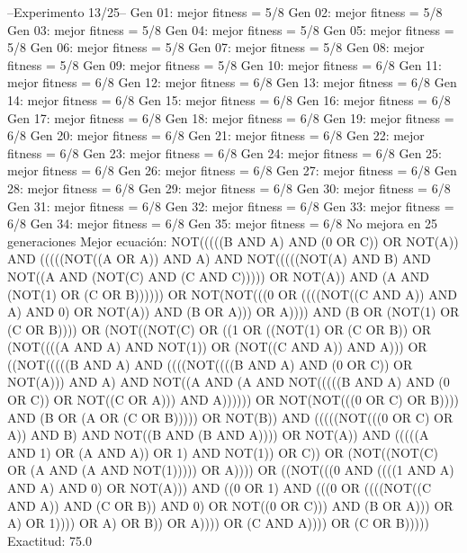 --Experimento 
 13/25--
Gen 01: mejor fitness = 5/8
Gen 02: mejor fitness = 5/8
Gen 03: mejor fitness = 5/8
Gen 04: mejor fitness = 5/8
Gen 05: mejor fitness = 5/8
Gen 06: mejor fitness = 5/8
Gen 07: mejor fitness = 5/8
Gen 08: mejor fitness = 5/8
Gen 09: mejor fitness = 5/8
Gen 10: mejor fitness = 6/8
Gen 11: mejor fitness = 6/8
Gen 12: mejor fitness = 6/8
Gen 13: mejor fitness = 6/8
Gen 14: mejor fitness = 6/8
Gen 15: mejor fitness = 6/8
Gen 16: mejor fitness = 6/8
Gen 17: mejor fitness = 6/8
Gen 18: mejor fitness = 6/8
Gen 19: mejor fitness = 6/8
Gen 20: mejor fitness = 6/8
Gen 21: mejor fitness = 6/8
Gen 22: mejor fitness = 6/8
Gen 23: mejor fitness = 6/8
Gen 24: mejor fitness = 6/8
Gen 25: mejor fitness = 6/8
Gen 26: mejor fitness = 6/8
Gen 27: mejor fitness = 6/8
Gen 28: mejor fitness = 6/8
Gen 29: mejor fitness = 6/8
Gen 30: mejor fitness = 6/8
Gen 31: mejor fitness = 6/8
Gen 32: mejor fitness = 6/8
Gen 33: mejor fitness = 6/8
Gen 34: mejor fitness = 6/8
Gen 35: mejor fitness = 6/8
No mejora en 25 generaciones
Mejor ecuación: NOT(((((B AND A) AND (0 OR C)) OR NOT(A)) AND (((((NOT((A OR A)) AND A) AND NOT(((((NOT(A) AND B) AND NOT((A AND (NOT(C) AND (C AND C))))) OR NOT(A)) AND (A AND (NOT(1) OR (C OR B)))))) OR NOT(NOT(((0 OR ((((NOT((C AND A)) AND A) AND 0) OR NOT(A)) AND (B OR A))) OR A)))) AND (B OR (NOT(1) OR (C OR B)))) OR (NOT((NOT(C) OR ((1 OR ((NOT(1) OR (C OR B)) OR (NOT((((A AND A) AND NOT(1)) OR (NOT((C AND A)) AND A))) OR ((NOT(((((B AND A) AND ((((NOT((((B AND A) AND (0 OR C)) OR NOT(A))) AND A) AND NOT((A AND (A AND NOT(((((B AND A) AND (0 OR C)) OR NOT((C OR A))) AND A)))))) OR NOT(NOT(((0 OR C) OR B)))) AND (B OR (A OR (C OR B))))) OR NOT(B)) AND (((((NOT(((0 OR C) OR A)) AND B) AND NOT((B AND (B AND A)))) OR NOT(A)) AND (((((A AND 1) OR (A AND A)) OR 1) AND NOT(1)) OR C)) OR (NOT((NOT(C) OR (A AND (A AND NOT(1))))) OR A)))) OR ((NOT(((0 AND ((((1 AND A) AND A) AND 0) OR NOT(A))) AND ((0 OR 1) AND (((0 OR ((((NOT((C AND A)) AND (C OR B)) AND 0) OR NOT((0 OR C))) AND (B OR A))) OR A) OR 1)))) OR A) OR B)) OR A)))) OR (C AND A)))) OR (C OR B)))))
 Exactitud: 75.0%

